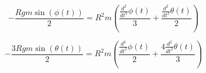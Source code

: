 \documentclass{article}
\begin{document}
\begin{equation}
    - \frac{R g m \sin{\left(\phi{\left(t \right)} \right)}}{2} = R^{2} m \left(\frac{\frac{d^{2}}{d t^{2}} \phi{\left(t \right)}}{3} + \frac{\frac{d^{2}}{d t^{2}} \theta{\left(t \right)}}{2}\right)
\end{equation}

\begin{equation}
    - \frac{3 R g m \sin{\left(\theta{\left(t \right)} \right)}}{2} = R^{2} m \left(\frac{\frac{d^{2}}{d t^{2}} \phi{\left(t \right)}}{2} + \frac{4 \frac{d^{2}}{d t^{2}} \theta{\left(t \right)}}{3}\right)
\end{equation}
\end{document}

